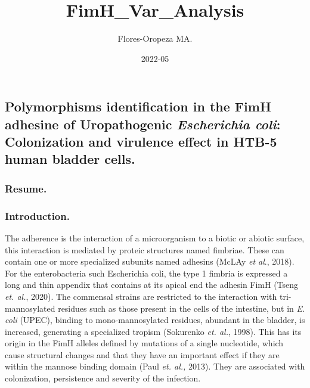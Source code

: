 \documentclass[
]{article}
\title{FimH\_Var\_Analysis}
\author{Flores-Oropeza MA.}
\date{2022-05}
\begin{document}
\maketitle

\hypertarget{polymorphisms-identification-in-the-fimh-adhesine-of-uropathogenic-escherichia-coli-colonization-and-virulence-effect-in-htb-5-human-bladder-cells.}{%
\subsection{\texorpdfstring{Polymorphisms identification in the FimH
adhesine of Uropathogenic \emph{Escherichia coli}: Colonization and
virulence effect in HTB-5 human bladder
cells.}{Polymorphisms identification in the FimH adhesine of Uropathogenic Escherichia coli: Colonization and virulence effect in HTB-5 human bladder cells.}}\label{polymorphisms-identification-in-the-fimh-adhesine-of-uropathogenic-escherichia-coli-colonization-and-virulence-effect-in-htb-5-human-bladder-cells.}}

\hypertarget{resume.}{%
\subsubsection{Resume.}\label{resume.}}

\hypertarget{introduction.}{%
\subsubsection{Introduction.}\label{introduction.}}

The adherence is the interaction of a microorganism to a biotic or
abiotic surface, this interaction is mediated by proteic structures
named fimbriae. These can contain one or more specialized subunits named
adhesins (McLAy \emph{et al}., 2018). For the enterobacteria such
Escherichia coli, the type 1 fimbria is expressed a long and thin
appendix that contains at its apical end the adhesin FimH (Tseng
\emph{et. al.}, 2020). The commensal strains are restricted to the
interaction with tri-mannosylated residues such as those present in the
cells of the intestine, but in \emph{E. coli} (UPEC), binding to
mono-mannosylated residues, abundant in the bladder, is increased,
generating a specialized tropism (Sokurenko \emph{et. al.}, 1998). This
has its origin in the FimH alleles defined by mutations of a single
nucleotide, which cause structural changes and that they have an
important effect if they are within the mannose binding domain (Paul
\emph{et. al.,} 2013). They are associated with colonization,
persistence and severity of the infection.\\
\end{document}
